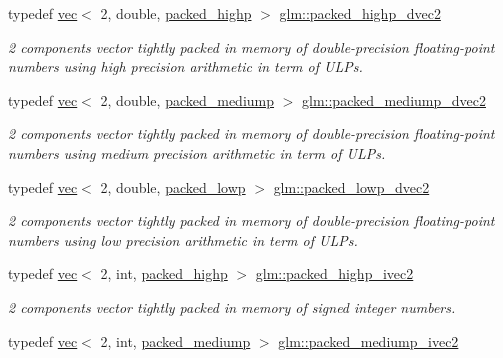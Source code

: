 \begin{DoxyCompactItemize}
typedef \hyperlink{structglm_1_1vec}{vec}$<$ 2, double, \hyperlink{namespaceglm_a36ed105b07c7746804d7fdc7cc90ff25a8e8791ee77fe079b1291f710d88031bf}{packed\+\_\+highp} $>$ \hyperlink{group__gtc__type__aligned_ga8c26414d99b8996aa7dc73e1dc8a06bd}{glm\+::packed\+\_\+highp\+\_\+dvec2}
\begin{DoxyCompactList}\small\item\em 2 components vector tightly packed in memory of double-\/precision floating-\/point numbers using high precision arithmetic in term of U\+L\+Ps. \end{DoxyCompactList}\item 
typedef \hyperlink{structglm_1_1vec}{vec}$<$ 2, double, \hyperlink{namespaceglm_a36ed105b07c7746804d7fdc7cc90ff25a9604654c3b137cd7898689fd34b25bc0}{packed\+\_\+mediump} $>$ \hyperlink{group__gtc__type__aligned_ga5cbf23f43f82491a631c35ca8664ae0b}{glm\+::packed\+\_\+mediump\+\_\+dvec2}
\begin{DoxyCompactList}\small\item\em 2 components vector tightly packed in memory of double-\/precision floating-\/point numbers using medium precision arithmetic in term of U\+L\+Ps. \end{DoxyCompactList}\item 
typedef \hyperlink{structglm_1_1vec}{vec}$<$ 2, double, \hyperlink{namespaceglm_a36ed105b07c7746804d7fdc7cc90ff25ac36a4bd74559be2c0b65bc48e5953b8b}{packed\+\_\+lowp} $>$ \hyperlink{group__gtc__type__aligned_gae61fd7d54de0db35af2b3b7fde2971f2}{glm\+::packed\+\_\+lowp\+\_\+dvec2}
\begin{DoxyCompactList}\small\item\em 2 components vector tightly packed in memory of double-\/precision floating-\/point numbers using low precision arithmetic in term of U\+L\+Ps. \end{DoxyCompactList}\item 
typedef \hyperlink{structglm_1_1vec}{vec}$<$ 2, int, \hyperlink{namespaceglm_a36ed105b07c7746804d7fdc7cc90ff25a8e8791ee77fe079b1291f710d88031bf}{packed\+\_\+highp} $>$ \hyperlink{group__gtc__type__aligned_gae362d70a8be88cc43b6c1ec0992e73db}{glm\+::packed\+\_\+highp\+\_\+ivec2}
\begin{DoxyCompactList}\small\item\em 2 components vector tightly packed in memory of signed integer numbers. \end{DoxyCompactList}\item 
typedef \hyperlink{structglm_1_1vec}{vec}$<$ 2, int, \hyperlink{namespaceglm_a36ed105b07c7746804d7fdc7cc90ff25a9604654c3b137cd7898689fd34b25bc0}{packed\+\_\+mediump} $>$ \hyperlink{group__gtc__type__aligned_ga42af0b51e654d83bd9201e96308942b5}{glm\+::packed\+\_\+mediump\+\_\+ivec2}

\end{DoxyCompactItemize}
